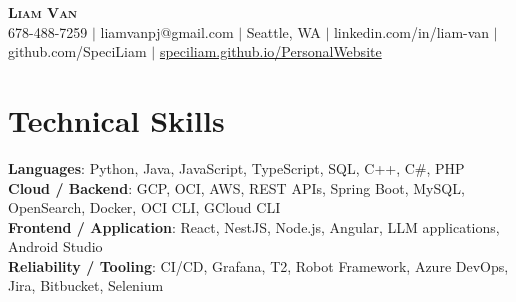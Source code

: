 \documentclass[letterpaper,11pt]{article}
\begin{document}

%
\begin{center}
    \textbf{\Huge \scshape Liam Van} \\ \vspace{1pt}
    \small 678-488-7259 $|$ \small {liamvanpj@gmail.com} $|$ Seattle, WA
 {{$|$ linkedin.com/in/liam-van} {$|$ github.com/SpeciLiam} {$|$ \href{https://speciliam.github.io/PersonalWebsite}{speciliam.github.io/PersonalWebsite}}}

\end{center}

\section{Technical Skills}
 \begin{itemize}[leftmargin=0.15in, label={}]
    \small{\item{
     \textbf{Languages}{: Python, Java, JavaScript, TypeScript, SQL, C++, C\#, PHP} \\
     \textbf{Cloud / Backend}{: GCP, OCI, AWS, REST APIs, Spring Boot, MySQL, OpenSearch, Docker, OCI CLI, GCloud CLI} \\
     \textbf{Frontend / Application}{: React, NestJS, Node.js, Angular, LLM applications, Android Studio} \\
     \textbf{Reliability / Tooling}{: CI/CD, Grafana, T2, Robot Framework, Azure DevOps, Jira, Bitbucket, Selenium} \\
    }}
 \end{itemize}
%
\end{document}
